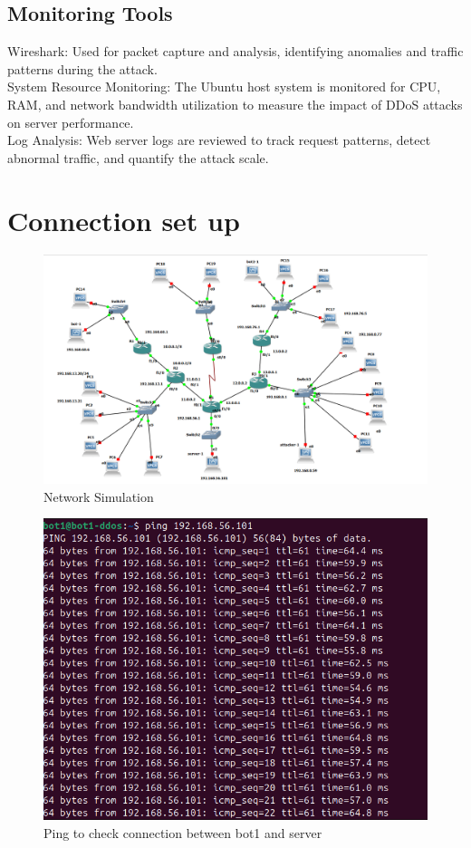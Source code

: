 \subsection{Monitoring Tools}
Wireshark: Used for packet capture and analysis, identifying anomalies and traffic patterns during the attack.
\\
System Resource Monitoring: The Ubuntu host system is monitored for CPU, RAM, and network bandwidth utilization to measure the impact of DDoS attacks on server performance.
\\
Log Analysis: Web server logs are reviewed to track request patterns, detect abnormal traffic, and quantify the attack scale.
\section{Connection set up}
\begin{figure}[htp]
    \centering
    \includegraphics[width=0.8\linewidth]{thesis/NetworkSimulation.png}
    \caption{Network Simulation}
    \label{fig:enter-label}
\end{figure}
\begin{figure}[htp]
    \centering
    \includegraphics[width=0.7\linewidth]{thesis/bot1ToServer.png}
    \caption{Ping to check connection between bot1 and server}
    \label{fig:enter-label}
\end{figure}
